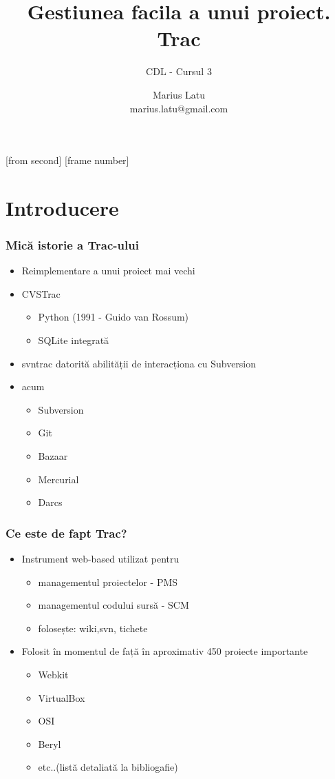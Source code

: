 \documentclass{beamer}
\title[Programe libere]{Gestiunea facila a unui proiect. Trac}
\subtitle{CDL - Cursul 3}
\institute{ROSEdu}
\author{Marius Latu \\ {\footnotesize marius.latu@gmail.com}}
\begin{document}
[from second]
[frame number]

\frame{\titlepage}
\frame{\tableofcontents}

\section{Introducere}

  \frame{\tableofcontents[currentsection]}
  
  \begin{frame}
  \frametitle{Mică istorie a Trac-ului}

  \begin{itemize}
  \pause \item Reimplementare a unui proiect mai vechi
  \pause \item CVSTrac \begin{itemize} \item Python (1991 - Guido van Rossum) \item SQLite integrată \end{itemize}
  \pause \item svntrac datorită abilității de interacționa cu Subversion
  \pause \item acum \begin{itemize} \item Subversion \item Git \item Bazaar \item Mercurial \item Darcs \end{itemize}
  \end{itemize}
  \end{frame}


  \begin{frame}
  \frametitle{Ce este de fapt Trac?}

  \begin{itemize}
  \pause \item Instrument web-based utilizat pentru 
	\begin{itemize}
	\item managementul proiectelor - PMS
	\item managementul codului sursă - SCM
	\item folosește: wiki,svn, tichete
	\end{itemize}
  \pause \item Folosit în momentul de față în aproximativ 450 proiecte importante
	\begin{itemize}
	\item Webkit 
	\item VirtualBox 
	\item OSI 
	\item Beryl 
	\item etc..(listă detaliată la bibliogafie)
	\end{itemize}
  \end{itemize}
  \end{frame}
\end{document}
